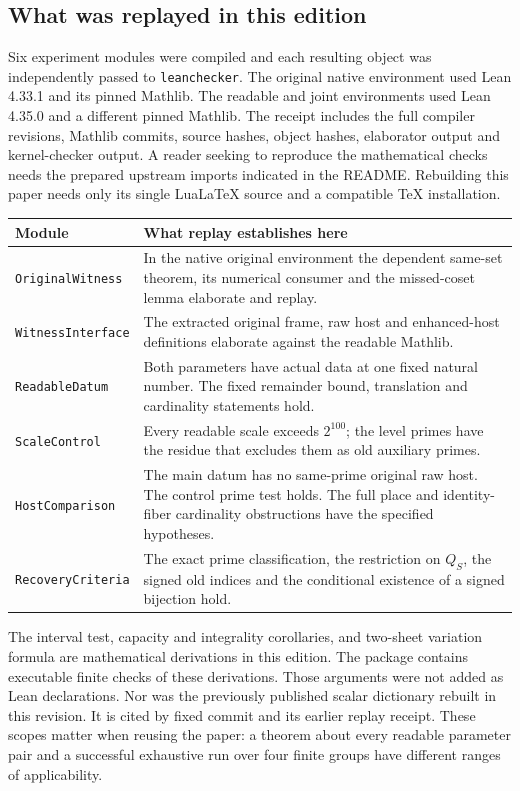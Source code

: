 \documentclass[12pt,letterpaper]{article}
\newcommand{\id}[1]{{\small\nolinkurl{#1}}}
\begin{document}
\subsection{What was replayed in this edition}
Six experiment modules were compiled and each resulting object was independently passed to \id{leanchecker}. The original native environment used Lean 4.33.1 and its pinned Mathlib. The readable and joint environments used Lean 4.35.0 and a different pinned Mathlib. The receipt includes the full compiler revisions, Mathlib commits, source hashes, object hashes, elaborator output and kernel-checker output. A reader seeking to reproduce the mathematical checks needs the prepared upstream imports indicated in the README. Rebuilding this paper needs only its single LuaLaTeX source and a compatible TeX installation.

\begin{center}\small
\begin{tabularx}{\linewidth}{@{}p{.32\linewidth}Y@{}}\toprule
Module & What replay establishes here\\\midrule
\id{OriginalWitness} & In the native original environment the dependent same-set theorem, its numerical consumer and the missed-coset lemma elaborate and replay.\\
\id{WitnessInterface} & The extracted original frame, raw host and enhanced-host definitions elaborate against the readable Mathlib.\\
\id{ReadableDatum} & Both parameters have actual data at one fixed natural number. The fixed remainder bound, translation and cardinality statements hold.\\
\id{ScaleControl} & Every readable scale exceeds $2^{100}$; the level primes have the residue that excludes them as old auxiliary primes.\\
\id{HostComparison} & The main datum has no same-prime original raw host. The control prime test holds. The full place and identity-fiber cardinality obstructions have the specified hypotheses.\\
\id{RecoveryCriteria} & The exact prime classification, the restriction on $Q_S$, the signed old indices and the conditional existence of a signed bijection hold.\\\bottomrule
\end{tabularx}\end{center}

The interval test, capacity and integrality corollaries, and two-sheet variation formula are mathematical derivations in this edition. The package contains executable finite checks of these derivations. Those arguments were not added as Lean declarations. Nor was the previously published scalar dictionary rebuilt in this revision. It is cited by fixed commit and its earlier replay receipt. These scopes matter when reusing the paper: a theorem about every readable parameter pair and a successful exhaustive run over four finite groups have different ranges of applicability.
\end{document}
